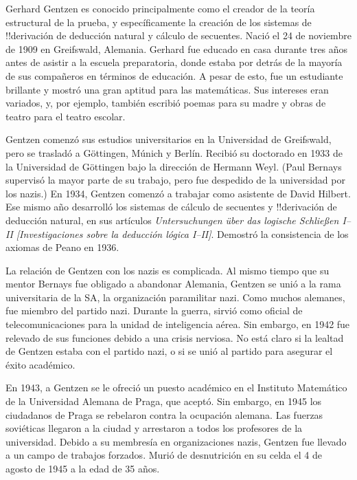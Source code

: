 \documentclass[../../../include/open-logic-section]{subfiles}
\begin{document}



Gerhard Gentzen es conocido principalmente como el creador de la teoría estructural de la prueba, y específicamente la creación de los sistemas de !!{derivación} de deducción natural y cálculo de secuentes. Nació el 24 de noviembre de 1909 en Greifswald, Alemania. Gerhard fue educado en casa durante tres años antes de asistir a la escuela preparatoria, donde estaba por detrás de la mayoría de sus compañeros en términos de educación. A pesar de esto, fue un estudiante brillante y mostró una gran aptitud para las matemáticas. Sus intereses eran variados, y, por ejemplo, también escribió poemas para su madre y obras de teatro para el teatro escolar.

Gentzen comenzó sus estudios universitarios en la Universidad de Greifswald, pero se trasladó a G\"{o}ttingen, Múnich y Berlín. Recibió su doctorado en 1933 de la Universidad de G\"{o}ttingen bajo la dirección de Hermann Weyl. (Paul Bernays supervisó la mayor parte de su trabajo, pero fue despedido de la universidad por los nazis.) En 1934, Gentzen comenzó a trabajar como asistente de David Hilbert. Ese mismo año desarrolló los sistemas de cálculo de secuentes y !!{derivación} de deducción natural, en sus artículos \emph{Untersuchungen \"{u}ber das logische Schlie\ss en I--II [Investigaciones sobre la deducción lógica I--II]}. Demostró la consistencia de los axiomas de Peano en 1936.

La relación de Gentzen con los nazis es complicada. Al mismo tiempo que su mentor Bernays fue obligado a abandonar Alemania, Gentzen se unió a la rama universitaria de la SA, la organización paramilitar nazi. Como muchos alemanes, fue miembro del partido nazi. Durante la guerra, sirvió como oficial de telecomunicaciones para la unidad de inteligencia aérea. Sin embargo, en 1942 fue relevado de sus funciones debido a una crisis nerviosa. No está claro si la lealtad de Gentzen estaba con el partido nazi, o si se unió al partido para asegurar el éxito académico.

En 1943, a Gentzen se le ofreció un puesto académico en el Instituto Matemático de la Universidad Alemana de Praga, que aceptó. Sin embargo, en 1945 los ciudadanos de Praga se rebelaron contra la ocupación alemana. Las fuerzas soviéticas llegaron a la ciudad y arrestaron a todos los profesores de la universidad. Debido a su membresía en organizaciones nazis, Gentzen fue llevado a un campo de trabajos forzados. Murió de desnutrición en su celda el 4 de agosto de 1945 a la edad de 35 años.
\end{document}
